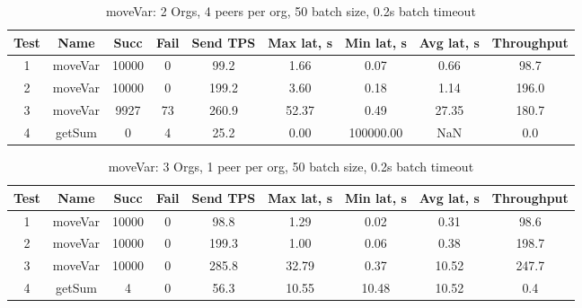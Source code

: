 \begin{appendices}
\begin{table}[h!]
\begin{center}
\begin{tabular}{ |c|c|c|c|c|c|c|c|c| }
 \hline
  Test & Name & Succ  & Fail & Send TPS & Max lat, s & Min lat, s & Avg lat, s & Throughput \\
 \hline
 \hline
 1    & moveVar & 10000 & 0    & 99.2  & 1.66      & 0.07      & 0.66      & 98.7  \\
 \hline
 2    & moveVar & 10000 & 0    & 199.2 & 3.60      & 0.18      & 1.14      & 196.0 \\
 \hline
 3    & moveVar & 9927  & 73   & 260.9 & 52.37     & 0.49      & 27.35     & 180.7 \\
 \hline
 4    & getSum  & 0     & 4    & 25.2  & 0.00      & 100000.00 & NaN       & 0.0   \\
 \hline
\end{tabular}
\end{center}
\caption{moveVar: 2 Orgs, 4 peers per org, 50 batch size, 0.2s batch timeout}
\end{table}

\begin{table}[h!]
\begin{center}
\begin{tabular}{ |c|c|c|c|c|c|c|c|c| }
 \hline
  Test & Name & Succ  & Fail & Send TPS & Max lat, s & Min lat, s & Avg lat, s & Throughput \\
 \hline
 \hline
 1    & moveVar & 10000 & 0    & 98.8  & 1.29      & 0.02      & 0.31      & 98.6  \\
 \hline
 2    & moveVar & 10000 & 0    & 199.3 & 1.00      & 0.06      & 0.38      & 198.7 \\
 \hline
 3    & moveVar & 10000 & 0    & 285.8 & 32.79     & 0.37      & 10.52     & 247.7 \\
 \hline
 4    & getSum  & 4     & 0    & 56.3  & 10.55     & 10.48     & 10.52     & 0.4   \\
 \hline
\end{tabular}
\end{center}
\caption{moveVar: 3 Orgs, 1 peer per org, 50 batch size, 0.2s batch timeout}
\end{table}


\end{appendices}

